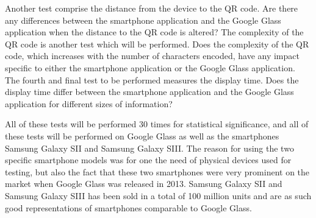 Another test comprise the distance from the device to the QR code. Are there any differences between the smartphone application and the Google Glass application when the distance to the QR code is altered? The complexity of the QR code is another test which will be performed. Does the complexity of the QR code, which increases with the number of characters encoded, have any impact specific to either the smartphone application or the Google Glass application. The fourth and final test to be performed measures the display time. Does the display time differ between the smartphone application and the Google Glass application for different sizes of information?

All of these tests will be performed 30 times for statistical significance, and all of these tests will be performed on Google Glass as well as the smartphones Samsung Galaxy SII and Samsung Galaxy SIII. The reason for using the two specific smartphone models was for one the need of physical devices used for testing, but also the fact that these two smartphones were very prominent on the market when Google Glass was released in 2013. Samsung Galaxy SII and Samsung Galaxy SIII has been sold in a total of 100 million units and are as such good representations of smartphones comparable to Google Glass.


